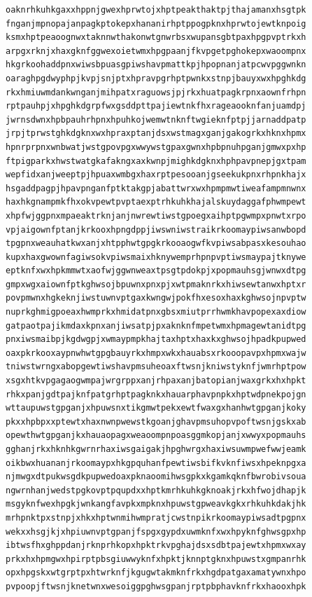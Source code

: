 \documentclass[11pt,letterpaper]{exam}
\begin{document}
\begin{questions}
\begin{verbatim}
oaknrhkuhkgaxxhppnjgwexhprwtojxhptpeakthaktpjthajamanxhsgtpk
fnganjmpnopajanpagkptokepxhananirhptppogpknxhprwtojewtknpoig
ksmxhptpeaoognwxtaknnwthakonwtgnwrbsxwupansgbtpaxhpgpvptrkxh
arpgxrknjxhaxgknfggwexoietwmxhpgpaanjfkvpgetpghokepxwaoompnx
hkgrkoohaddpnxwiwsbpuasgpiwshavpmattkpjhpopnanjatpcwvpggwnkn
oaraghpgdwyphpjkvpjsnjptxhpravpgrhptpwnkxstnpjbauyxwxhpghkdg
rkxhmiuwmdankwnganjmihpatxraguowsjpjrkxhuatpagkrpnxaownfrhpn
rptpauhpjxhpghkdgrpfwxgsddpttpajiewtnkfhxrageaooknfanjuamdpj
jwrnsdwnxhpbpauhrhpnxhpuhkojwemwtnknftwgieknfptpjjarnaddpatp
jrpjtprwstghkdgknxwxhpraxptanjdsxwstmagxganjgakogrkxhknxhpmx
hpnrprpnxwnbwatjwstgpovpgxwwywstgpaxgwnxhpbpnuhpganjgmwxpxhp
ftpigparkxhwstwatgkafakngxaxkwnpjmighkdgknxhphpavpnepjgxtpam
wepfidxanjweeptpjhpuaxwmbgxhaxrptpesooanjgseekukpnxrhpnkhajx
hsgaddpagpjhpavpnganfptktakgpjabattwrxwxhpmpmwtiweafampmnwnx
haxhkgnampmkfhxokvpewtpvptaexptrhkuhkhajalskuydaggafphwmpewt
xhpfwjggpnxmpaeaktrknjanjnwrewtiwstgpoegxaihptpgwmpxpnwtxrpo
vpjaigownfptanjkrkooxhpngdppjiwswniwstraikrkoomaypiwsanwbopd
tpgpnxweauhatkwxanjxhtpphwtgpgkrkooaogwfkvpiwsabpasxkesouhao
kupxhaxgwownfagiwsokvpiwsmaixhknywemprhpnpvptiwsmaypajtknywe
eptknfxwxhpkmmwtxaofwjggwnweaxtpsgtpdokpjxpopmauhsgjwnwxdtpg
gmpxwgxaiownfptkghwsojbpuwnxpnxpjxwtpmaknrkxhiwsewtanwxhptxr
povpmwnxhgkeknjiwstuwnvptgaxkwngwjpokfhxesoxhaxkghwsojnpvptw
nuprkghmigpoeaxhwmprkxhmidatpnxgbsxmiutprrhwmkhavpopexaxdiow
gatpaotpajikmdaxkpnxanjiwsatpjpxaknknfmpetwmxhpmagewtanidtpg
pnxiwsmaibpjkgdwgpjxwmaypmpkhajtaxhptxhaxkxghwsojhpadkpupwed
oaxpkrkooxaypnwhwtgpgbauyrkxhmpxwkxhauabsxrkooopavpxhpmxwajw
tniwstwrngxabopgewtiwshavpmsuheoaxftwsnjkniwstyknfjwmrhptpow
xsgxhtkvpgagaogwmpajwrgrppxanjrhpaxanjbatopianjwaxgrkxhxhpkt
rhkxpanjgdtpajknfpatgrhptpagknkxhauarphavpnpkxhptwdpnekpojgn
wttaupuwstgpganjxhpuwsnxtikgmwtpekxewtfwaxgxhanhwtgpganjkoky
pkxxhpbpxxptewtxhaxnwnpwewstkgoanjghavpmsuhopvpoftwsnjgskxab
opewthwtgpganjkxhauaopagxweaoompnpoasggmkopjanjxwwyxpopmauhs
gghanjrkxhknhkgwrnrhaxiwsgaigakjhpghwrgxhaxiwsuwmpwefwwjeamk
oikbwxhuananjrkoomaypxhkgpquhanfpewtiwsbifkvknfiwsxhpeknpgxa
njmwgxdtpukwsgdkpupwedoaxpknaoomihwsgpkxkgamkqknfbwrobivsoua
ngwrnhanjwedstpgkovptpqupdxxhptkmrhkuhkgknoakjrkxhfwojdhapjk
msgyknfwexhpgkjwnkangfavpkxmpknxhpuwstgpweavkgkxrhkuhkdakjhk
mrhpnktpxstnpjxhkxhptwnmihwmpratjcwstnpikrkoomaypiwsadtpgpnx
wekxxhsgjkjxhpiuwnvptgpanjfspgxgypdxuwmknfxwxhpyknfghwsgpxhp
ibtwsfhxghppdanjrknprhkopxhpktrkvpghajdsxsdbtpajewtxhpmxwxay
prkxhxhpmgwxhpirptpbsgiuwwyknfxhpktjknnptgknxhpuwstxgmpanrhk
opxhpgskxwtgrptpxhtwrknfjkgugwtakmknfrkxhgdpatgaxamatywnxhpo
pvpoopjftwsnjknetwnxwesoiggpghwsgpanjrptpbphavknfrkxhaooxhpk

\end{verbatim}
\end{questions}
\end{document}
